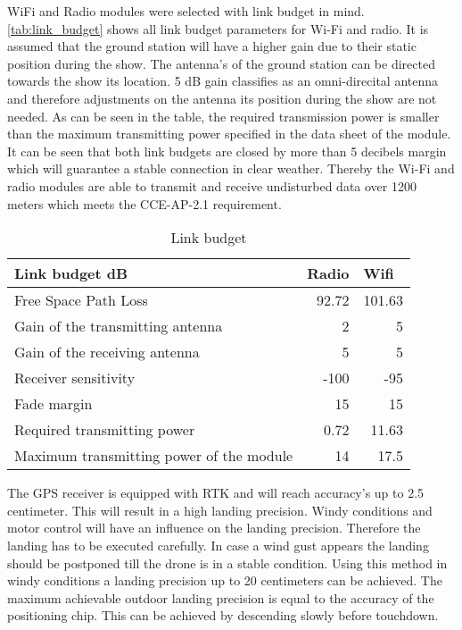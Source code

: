 WiFi and Radio modules were selected with link budget in mind. \autoref{tab:link_budget} shows all link budget parameters for Wi-Fi and radio. It is assumed that the ground station will have a higher gain due to their static position during the show. The antenna's of the ground station can be directed towards the show its location. 5 dB gain classifies as an omni-direcital\cite{antenna_gains} antenna and therefore adjustments on the antenna its position during the show are not needed. As can be seen in the table, the required transmission power is smaller than the maximum transmitting power specified in the data sheet of the module. It can be seen that both link budgets are closed by more than 5 decibels margin which will guarantee a stable connection in clear weather. Thereby the Wi-Fi and radio modules are able to transmit and receive undisturbed data over 1200 meters which meets the CCE-AP-2.1 requirement.
\begin{centering}
    

\begin{table}[H]
\caption{Link budget}
\label{tab:link_budget}
\begin{tabular}{|l|r|r|}

\hline
Link budget dB                           & \multicolumn{1}{l|}{Radio} & \multicolumn{1}{l|}{Wifi} \\ \hline
Free Space Path Loss                     & 92.72               & 101.63               \\ \hline
Gain of the transmitting antenna         & 2                          & 5                         \\ \hline
Gain of the receiving antenna            & 5                          & 5                         \\ \hline
Receiver sensitivity                     & -100                       & -95                       \\ \hline
Fade margin                              & 15                         & 15                        \\ \hline
Required transmitting power              & 0.72               & 11.63               \\ \hline
Maximum transmitting power of the module & 14                         & 17.5                      \\ \hline
\end{tabular}
\end{table}
\end{centering}
The GPS receiver is equipped with RTK and will reach accuracy's up to 2.5 centimeter\cite{U-blox}. This will result in a high landing precision. Windy conditions and motor control will have an influence on the landing precision. Therefore the landing has to be executed carefully. In case a wind gust appears the landing should be postponed till the drone is in a stable condition. Using this method in windy conditions a landing precision up to 20 centimeters can be achieved. The maximum achievable outdoor landing precision is equal to the accuracy of the positioning chip. This can be achieved by descending slowly before touchdown.

